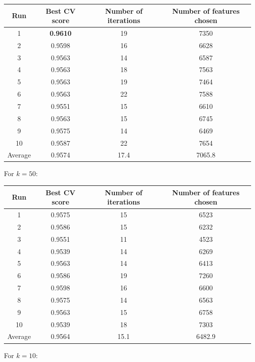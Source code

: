 \documentclass[12pt, twoside, a4paper]{report}
\begin{document}
\begin{center}
    \begin{tabular}{| c | c | c | c | } \hline
    Run & Best CV score & Number of iterations & Number of features chosen \\ \hline \hline
    1 & \textbf{0.9610} & 19 & 7350 \\ \hline
	2 & 0.9598  & 16 & 6628 \\ \hline
	3 & 0.9563 & 14 & 6587 \\ \hline
	4 & 0.9563 & 18 & 7563 \\ \hline
	5 & 0.9563 & 19 & 7464 \\ \hline
	6 & 0.9563 & 22 & 7588 \\ \hline
	7 & 0.9551 & 15 & 6610 \\ \hline
	8 & 0.9563 & 15 & 6745 \\ \hline
	9 & 0.9575 & 14 & 6469 \\ \hline
	10 & 0.9587 & 22 & 7654 \\ \hline
	Average & 0.9574 & 17.4 & 7065.8 \\ \hline
    \end{tabular}
\end{center}

For $k=50$:

\begin{center}
    \begin{tabular}{| c | c | c | c | } \hline
    Run & Best CV score & Number of iterations & Number of features chosen \\ \hline \hline
    1 & 0.9575 & 15 & 6523 \\ \hline
	2 & 0.9586  & 15 & 6232 \\ \hline
	3 & 0.9551 & 11 & 4523 \\ \hline
	4 & 0.9539 & 14 & 6269 \\ \hline
	5 & 0.9563 & 14 & 6413 \\ \hline
	6 & 0.9586 & 19 & 7260 \\ \hline
	7 & 0.9598 & 16 & 6600 \\ \hline
	8 & 0.9575 & 14 & 6563 \\ \hline
	9 & 0.9563 & 15 & 6758 \\ \hline
	10 & 0.9539 & 18 & 7303 \\ \hline
	Average & 0.9564 & 15.1 & 6482.9 \\ \hline
    \end{tabular}
\end{center}


For $k=10$:
\end{document}

